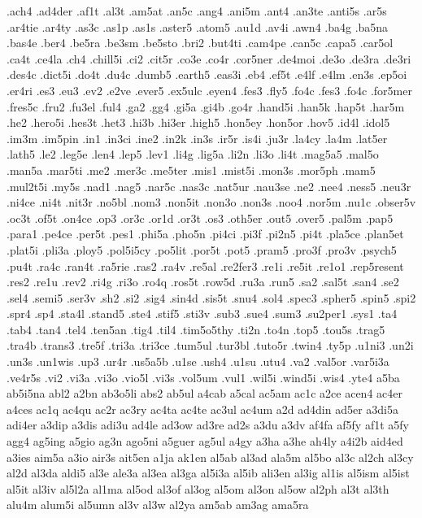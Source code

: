 .ach4
.ad4der
.af1t
.al3t
.am5at
.an5c
.ang4
.ani5m
.ant4
.an3te
.anti5s
.ar5s
.ar4tie
.ar4ty
.as3c
.as1p
.as1s
.aster5
.atom5
.au1d
.av4i
.awn4
.ba4g
.ba5na
.bas4e
.ber4
.be5ra
.be3sm
.be5sto
.bri2
.but4ti
.cam4pe
.can5c
.capa5
.car5ol
.ca4t
.ce4la
.ch4
.chill5i
.ci2
.cit5r
.co3e
.co4r
.cor5ner
.de4moi
.de3o
.de3ra
.de3ri
.des4c
.dict5i
.do4t
.du4c
.dumb5
.earth5
.eas3i
.eb4
.ef5t
.e4lf
.e4lm
.en3s
.ep5oi
.er4ri
.es3
.eu3
.ev2
.e2ve
.ever5
.ex5ulc
.eyen4
.fes3
.fly5
.fo4c
.fes3
.fo4c
.for5mer
.fres5c
.fru2
.fu3el
.ful4
.ga2
.gg4
.gi5a
.gi4b
.go4r
.hand5i
.han5k
.hap5t
.har5m
.he2
.hero5i
.hes3t
.het3
.hi3b
.hi3er
.high5
.hon5ey
.hon5or
.hov5
.id4l
.idol5
.im3m
.im5pin
.in1
.in3ci
.ine2
.in2k
.in3s
.ir5r
.is4i
.ju3r
.la4cy
.la4m
.lat5er
.lath5
.le2
.leg5e
.len4
.lep5
.lev1
.li4g
.lig5a
.li2n
.li3o
.li4t
.mag5a5
.mal5o
.man5a
.mar5ti
.me2
.mer3c
.me5ter
.mis1
.mist5i
.mon3s
.mor5ph
.mam5
.mul2t5i
.my5s
.nad1
.nag5
.nar5c
.nas3c
.nat5ur
.nau3se
.ne2
.nee4
.ness5
.neu3r
.ni4ce
.ni4t
.nit3r
.no5bl
.nom3
.non5it
.non3o
.non3s
.noo4
.nor5m
.nu1c
.obser5v
.oc3t
.of5t
.on4ce
.op3
.or3c
.or1d
.or3t
.os3
.oth5er
.out5
.over5
.pal5m
.pap5
.para1
.pe4ce
.per5t
.pes1
.phi5a
.pho5n
.pi4ci
.pi3f
.pi2n5
.pi4t
.pla5ce
.plan5et
.plat5i
.pli3a
.ploy5
.pol5i5cy
.po5lit
.por5t
.pot5
.pram5
.pro3f
.pro3v
.psych5
.pu4t
.ra4c
.ran4t
.ra5rie
.ras2
.ra4v
.re5al
.re2fer3
.re1i
.re5it
.re1o1
.rep5resent
.res2
.re1u
.rev2
.ri4g
.ri3o
.ro4q
.ros5t
.row5d
.ru3a
.run5
.sa2
.sal5t
.san4
.se2
.sel4
.semi5
.ser3v
.sh2
.si2
.sig4
.sin4d
.sis5t
.snu4
.sol4
.spec3
.spher5
.spin5
.spi2
.spr4
.sp4
.sta4l
.stand5
.ste4
.stif5
.sti3v
.sub3
.sue4
.sum3
.su2per1
.sys1
.ta4
.tab4
.tan4
.tel4
.ten5an
.tig4
.til4
.tim5o5thy
.ti2n
.to4n
.top5
.tou5s
.trag5
.tra4b
.trans3
.tre5f
.tri3a
.tri3ce
.tum5ul
.tur3bl
.tuto5r
.twin4
.ty5p
.u1ni3
.un2i
.un3s
.un1wis
.up3
.ur4r
.us5a5b
.u1se
.ush4
.u1su
.utu4
.va2
.val5or
.var5i3a
.ve4r5s
.vi2
.vi3a
.vi3o
.vio5l
.vi3s
.vol5um
.vul1
.wil5i
.wind5i
.wis4
.yte4
a5ba
ab5i5na
abl2
a2bn
ab3o5li
abs2
ab5ul
a4cab
a5cal
ac5am
ac1c
a2ce
acen4
ac4er
a4ces
ac1q
ac4qu
ac2r
ac3ry
ac4ta
ac4te
ac3ul
ac4um
a2d
ad4din
ad5er
a3di5a
adi4er
a3dip
a3dis
adi3u
ad4le
ad3ow
ad3re
ad2s
a3du
a3dv
af4fa
af5fy
af1t
a5fy
agg4
ag5ing
a5gio
ag3n
ago5ni
a5guer
ag5ul
a4gy
a3ha
a3he
ah4ly
a4i2b
aid4ed
a3ies
aim5a
a3io
air3s
ait5en
a1ja
ak1en
al5ab
al3ad
ala5m
al5bo
al3c
al2ch
al3cy
al2d
al3da
aldi5
al3e
ale3a
al3ea
al3ga
al5i3a
al5ib
ali3en
al3ig
al1is
al5ism
al5ist
al5it
al3iv
al5l2a
al1ma
al5od
al3of
al3og
al5om
al3on
al5ow
al2ph
al3t
al3th
alu4m
alum5i
al5umn
al3v
al3w
al2ya
am5ab
am3ag
ama5ra
